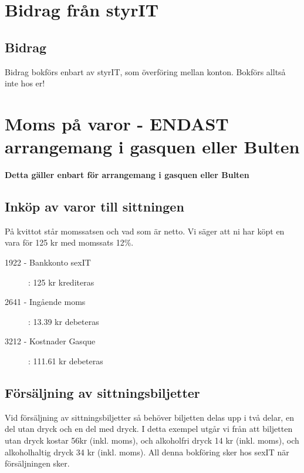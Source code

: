 \documentclass{article}
\begin{document}
\section{Bidrag från styrIT}
\subsection{Bidrag}
Bidrag bokförs enbart av styrIT, som överföring mellan konton. Bokförs alltså inte hos er! 

\section{Moms på varor - ENDAST arrangemang i gasquen eller Bulten}
\textbf{Detta gäller enbart för arrangemang i gasquen eller Bulten}
\subsection{Inköp av varor till sittningen}
På kvittot står momssatsen och vad som är netto. Vi säger att ni har köpt en vara för 125 kr med momssats 12\%. 
\begin{description}
    \item [1922 - Bankkonto sexIT ]: 125 kr krediteras
    \item [2641 - Ingående moms]: 13.39 kr debeteras
    \item [3212 - Kostnader Gasque]: 111.61 kr debeteras
\end{description}

\subsection{Försäljning av sittningsbiljetter}
Vid försäljning av sittningsbiljetter så behöver biljetten delas upp i två delar, en del utan dryck och en del med dryck. I detta exempel utgår vi från att biljetten utan dryck kostar 56kr (inkl. moms), och alkoholfri dryck 14 kr (inkl. moms), och alkoholhaltig dryck 34 kr (inkl. moms). All denna bokföring sker hos sexIT när försäljningen sker.
\end{document}
